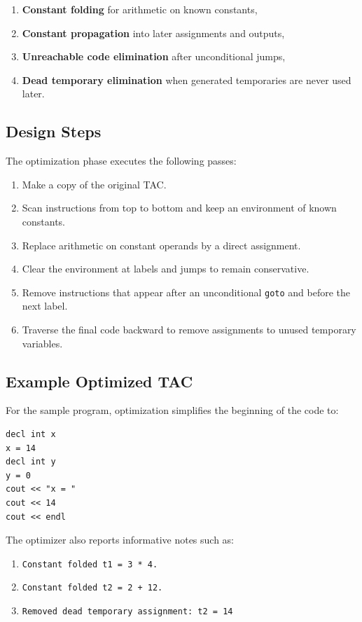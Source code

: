 \documentclass[12pt,a4paper]{article}
\begin{document}
\begin{enumerate}
    \item \textbf{Constant folding} for arithmetic on known constants,
    \item \textbf{Constant propagation} into later assignments and outputs,
    \item \textbf{Unreachable code elimination} after unconditional jumps,
    \item \textbf{Dead temporary elimination} when generated temporaries are never used later.
\end{enumerate}

\subsection{Design Steps}
The optimization phase executes the following passes:

\begin{enumerate}
    \item Make a copy of the original TAC.
    \item Scan instructions from top to bottom and keep an environment of known constants.
    \item Replace arithmetic on constant operands by a direct assignment.
    \item Clear the environment at labels and jumps to remain conservative.
    \item Remove instructions that appear after an unconditional \texttt{goto} and before the next label.
    \item Traverse the final code backward to remove assignments to unused temporary variables.
\end{enumerate}

\subsection{Example Optimized TAC}
For the sample program, optimization simplifies the beginning of the code to:

\begin{lstlisting}
decl int x
x = 14
decl int y
y = 0
cout << "x = "
cout << 14
cout << endl
\end{lstlisting}

The optimizer also reports informative notes such as:

\begin{enumerate}
    \item \texttt{Constant folded t1 = 3 * 4.}
    \item \texttt{Constant folded t2 = 2 + 12.}
    \item \texttt{Removed dead temporary assignment: t2 = 14}
\end{enumerate}
\end{document}
